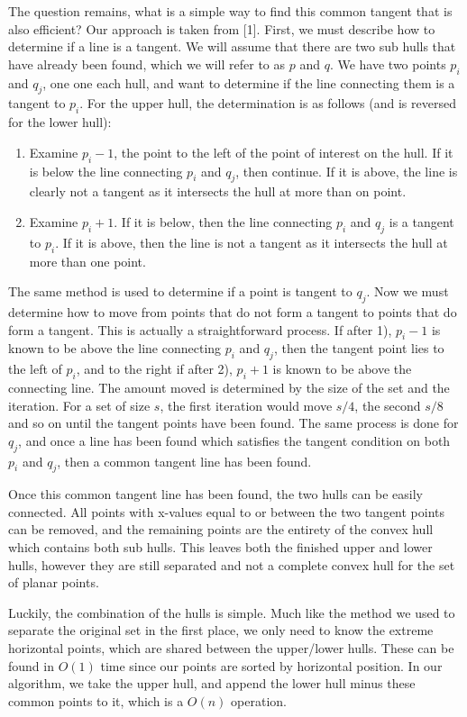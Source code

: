 \documentclass[conference]{IEEEtran}
\begin{document}
The question remains, what is a simple way to find this common tangent that is also efficient? Our approach is taken from [1]. First, we must describe how to determine if a line is a tangent. We will assume that there are two sub hulls that have already been found, which we will refer to as $p$ and $q$. We have two points $p_i$ and $q_j$, one one each hull, and want to determine if the line connecting them is a tangent to $p_i$. For the upper hull, the determination is as follows (and is reversed for the lower hull):

\begin{enumerate}
    \item Examine $p_i-1$, the point to the left of the point of interest on the hull. If it is below the line connecting $p_i$ and $q_j$, then continue. If it is above, the line is clearly not a tangent as it intersects the hull at more than on point.
    \item Examine $p_i+1$. If it is below, then the line connecting $p_i$ and $q_j$ is a tangent to $p_i$. If it is above, then the line is not a tangent as it intersects the hull at more than one point.
\end{enumerate} 

The same method is used to determine if a point is tangent to $q_j$. Now we must determine how to move from points that do not form a tangent to points that do form a tangent. This is actually a straightforward process. If after 1), $p_i-1$ is known to be above the line connecting $p_i$ and $q_j$, then the tangent point lies to the left of $p_i$, and to the right if after 2), $p_i+1$ is known to be above the connecting line. The amount moved is determined by the size of the set and the iteration. For a set of size $s$, the first iteration would move $s/4$, the second $s/8$ and so on until the tangent points have been found. The same process is done for $q_j$, and once a line has been found which satisfies the tangent condition on both $p_i$ and $q_j$, then a common tangent line has been found.

Once this common tangent line has been found, the two hulls can be easily connected. All points with x-values equal to or between the two tangent points can be removed, and the remaining points are the entirety of the convex hull which contains both sub hulls. This leaves both the finished upper and lower hulls, however they are still separated and not a complete convex hull for the set of planar points.

Luckily, the combination of the hulls is simple. Much like the method we used to separate the original set in the first place, we only need to know the extreme horizontal points, which are shared between the upper/lower hulls. These can be found in $O(1)$ time since our points are sorted by horizontal position. In our algorithm, we take the upper hull, and append the lower hull minus these common points to it, which is a $O(n)$ operation. 
\end{document}

